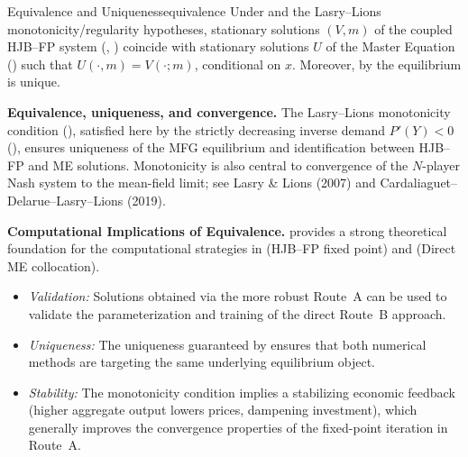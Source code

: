 ﻿\documentclass[11pt,letterpaper,oneside]{article}
\numberwithin{equation}{section}
\newcommand{\ac}[1]{{\mdseries\textsc{#1}}}
\newcommand{\1}{\mathbf{1}}
\begin{document}
\begin{theorem}{Equivalence and Uniqueness}{equivalence}
Under  and the Lasry--Lions monotonicity/regularity hypotheses, stationary solutions $(V,m)$ of the coupled \ac{HJB}--\ac{FP} system (, ) coincide with stationary solutions $U$ of the Master Equation () such that $U(\cdot, m) = V(\cdot; m)$, conditional on $x$. Moreover, by  the equilibrium is unique.
\end{theorem}

\begin{tcolorbox}[literaturestyle]
\textbf{Equivalence, uniqueness, and convergence.} The Lasry--Lions monotonicity condition (), satisfied here by the strictly decreasing inverse demand $P'(Y)<0$ (), ensures uniqueness of the MFG equilibrium and identification between HJB--FP and ME solutions. Monotonicity is also central to convergence of the $N$-player Nash system to the mean-field limit; see Lasry \& Lions (2007) and Cardaliaguet--Delarue--Lasry--Lions (2019).
\end{tcolorbox}

\begin{tcolorbox}[mathstyle]
\textbf{Computational Implications of Equivalence.}
 provides a strong theoretical foundation for the computational strategies in  (HJB--FP fixed point) and  (Direct ME collocation).
\begin{itemize}[leftmargin=1.15em,itemsep=0.25em]
\item \emph{Validation:} Solutions obtained via the more robust Route~A can be used to validate the parameterization and training of the direct Route~B approach.
\item \emph{Uniqueness:} The uniqueness guaranteed by  ensures that both numerical methods are targeting the same underlying equilibrium object.
\item \emph{Stability:} The monotonicity condition implies a stabilizing economic feedback (higher aggregate output lowers prices, dampening investment), which generally improves the convergence properties of the fixed-point iteration in Route~A.
\end{itemize}
\end{tcolorbox}
\end{document}
